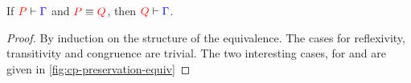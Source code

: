 \begin{lemma}\label{thm:cp-preservation-equiv}
  If $\seq[{ P }]{ \Gamma }$ and $\tm{P} \equiv \tm{Q}$,
  then $\seq[{ Q }]{\Gamma }$.
\end{lemma}
\begin{proof}
  By induction on the structure of the equivalence. The cases for reflexivity,
  transitivity and congruence are trivial. The two interesting cases, for
  \cpEquivCutComm and  are given in \cref{fig:cp-preservation-equiv}
\end{proof}

